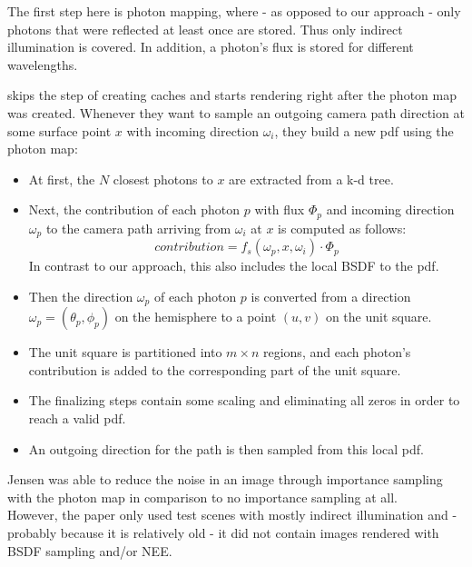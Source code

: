 The first step here is photon mapping, where - as opposed to our approach - only photons that were reflected at least once are stored. Thus only indirect illumination is covered. In addition, a photon's flux is stored for different wavelengths.

\cite{idpt} skips the step of creating caches and starts rendering right after the photon map was created. Whenever they want to sample an outgoing camera path direction at some surface point $x$ with incoming direction $\omega_i$, they build a new pdf using the photon map:

\begin{itemize}
\item At first, the $N$ closest photons to $x$ are extracted from a k-d tree. 
\item Next, the contribution of each photon $p$ with flux $\Phi_p$ and incoming direction $\omega_p$ to the camera path arriving from $\omega_i$ at $x$ is computed as follows:
\begin{equation}
contribution = f_s(\omega_p,x,\omega_i) \cdot \Phi_p
\end{equation}
In contrast to our approach, this also includes the local BSDF to the pdf.
\item Then the direction $\omega_p$ of each photon $p$ is converted from a direction $\omega_p = (\theta_p,\phi_p)$ on the hemisphere to a point $(u,v)$ on the unit square.
\item The unit square is partitioned into $m\times n$ regions, and each photon's contribution is added to the corresponding part of the unit square.
\item The finalizing steps contain some scaling and eliminating all zeros in order to reach a valid pdf.
\item An outgoing direction for the path is then sampled from this local pdf.
\end{itemize}

Jensen was able to reduce the noise in an image through importance sampling with the photon map in comparison to no importance sampling at all.\\
However, the paper only used test scenes with mostly indirect illumination and - probably because it is relatively old - it did not contain images rendered with BSDF sampling and/or NEE.

